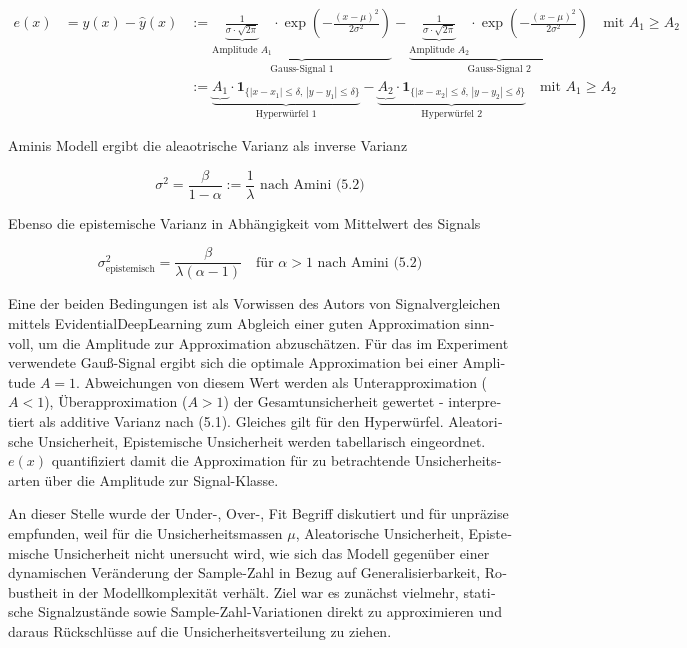 \begin{otherlanguage}{ngerman}
{\small
\begin{align}
e(x)     &= y(x) - \hat{y}(x)
& :=
\underbrace{
  \underbrace{\frac{1}{\sigma \cdot \sqrt{2\pi}}}_{\text{Amplitude } A_1}
  \cdot \exp\left( -\frac{(x - \mu)^2}{2\sigma^2} \right)
}_{\text{Gauss-Signal 1}}
- 
\underbrace{
  \underbrace{\frac{1}{\sigma \cdot \sqrt{2\pi}}}_{\text{Amplitude } A_2}
  \cdot \exp\left( -\frac{(x - \mu)^2}{2\sigma^2} \right)
}_{\text{Gauss-Signal 2}}
\quad \text{mit } A_1 \geq A_2
\\[1.0em]
& & :=
\underbrace{
  \underbrace{A_1}
  \cdot \mathbf{1}_{\{|x - x_1| \leq \delta,\, |y - y_1| \leq \delta\}}
}_{\text{Hyperwürfel 1}}
-
\underbrace{
  \underbrace{A_2}
  \cdot \mathbf{1}_{\{|x - x_2| \leq \delta,\, |y - y_2| \leq \delta\}}
}_{\text{Hyperwürfel 2}}
\quad \text{mit } A_1 \geq A_2
\end{align}
}



Aminis Modell ergibt die aleaotrische Varianz als inverse Varianz 

\[
\sigma^{2} = \frac{\beta}{1 - \alpha} := \frac{1}{\lambda} \text{ nach Amini (5.2)}
\]

Ebenso die epistemische Varianz in Abhängigkeit vom Mittelwert des Signals

\[
\sigma^2_{\text{epistemisch}} = \frac{\beta}{\lambda(\alpha - 1)} \quad \text{für } \alpha > 1 \text{ nach Amini (5.2)}
\]

Eine der beiden Bedingungen ist als Vorwissen des Autors von Signalvergleichen mittels \gls{EvidentialDeepLearning} zum Abgleich einer guten Approximation sinnvoll, um die Amplitude zur Approximation abzuschätzen. Für das im Experiment verwendete Gauß-Signal ergibt sich die optimale Approximation bei einer Amplitude $A = 1$. Abweichungen von diesem Wert werden als Unterapproximation ($A < 1$), Überapproximation ($A > 1$) der Gesamtunsicherheit gewertet - interpretiert als additive Varianz nach (5.1). Gleiches gilt für den Hyperwürfel. \gls{Aleatorische Unsicherheit}, \gls{Epistemische Unsicherheit} werden tabellarisch eingeordnet. $e(x)$ quantifiziert damit die Approximation für zu betrachtende Unsicherheitsarten über die Amplitude zur Signal-Klasse. 

An dieser Stelle wurde der Under-, Over-, Fit Begriff diskutiert und für unpräzise empfunden, weil für die Unsicherheitsmassen $\mu$, \gls{Aleatorische Unsicherheit}, \gls{Epistemische Unsicherheit} nicht unersucht wird, wie sich das Modell gegenüber einer dynamischen Veränderung der Sample-Zahl in Bezug auf Generalisierbarkeit, Robustheit in der Modellkomplexität verhält. Ziel war es zunächst vielmehr, statische Signalzustände sowie Sample-Zahl-Variationen direkt zu approximieren und daraus Rückschlüsse auf die Unsicherheitsverteilung zu ziehen.



\end{otherlanguage}
